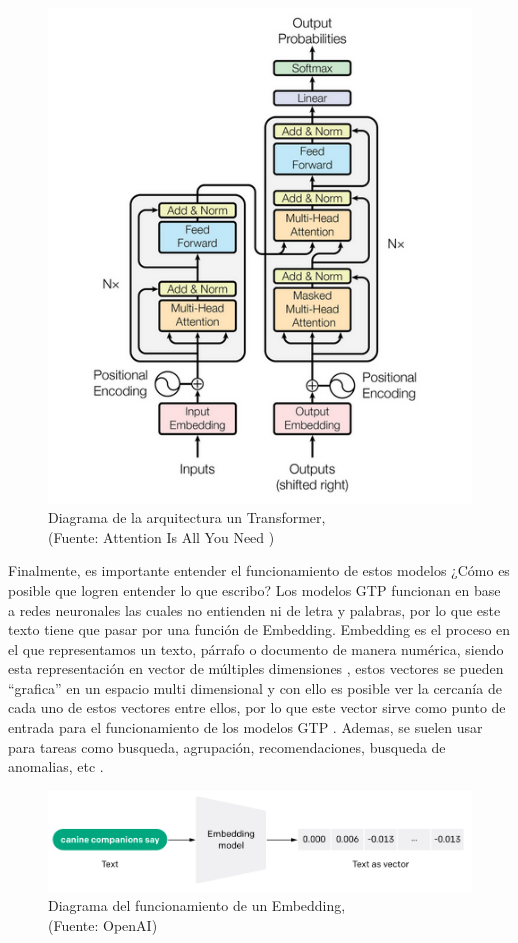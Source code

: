 \begin{figure}[ht!]
    \centering
    \includegraphics[width=.7\textwidth]{figures/ea3.png}
    \caption[Diagrama de la arquitectura un Transformer]{Diagrama de la arquitectura un Transformer,\\
    {\scriptsize (Fuente: Attention Is All You Need \cite{aiayn})}}
    \label{fig:ea4}
\end{figure}

\newpage

Finalmente, es importante entender el funcionamiento de estos modelos ¿Cómo es posible que logren entender lo que escribo? Los modelos 
GTP funcionan en base a redes neuronales las cuales no entienden ni de letra y palabras, por lo que este texto tiene que pasar por
una función de Embedding. Embedding es el proceso en el que representamos un texto, párrafo o documento de manera numérica, siendo
esta representación en vector de múltiples dimensiones \cite{eb1}, estos vectores se pueden ``grafica'' en un espacio multi dimensional y con 
ello es posible ver la cercanía de cada uno de estos vectores entre ellos, por lo que este vector sirve como punto de entrada para
el funcionamiento de los modelos GTP \cite{eb2}. Ademas, se suelen usar para tareas como busqueda, agrupación, recomendaciones, 
busqueda de anomalias, etc \cite{eb3}.

\begin{figure}[ht!]
    \centering
    \includegraphics[width=.8\textwidth]{figures/huemul4.png}
    \caption[Diagrama del funcionamiento de un Embedding]{Diagrama del funcionamiento de un Embedding,\\
    {\scriptsize (Fuente: OpenAI\cite{openai1})}}
    \label{fig:ea5}
\end{figure}

